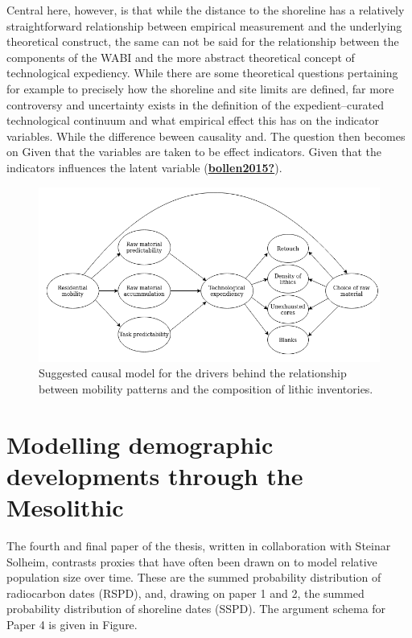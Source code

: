 \documentclass[
  12pt,
  a4paper,
  oneside]{book}
\begin{document}
Central here, however, is that while the distance to the shoreline has a relatively straightforward relationship between empirical measurement and the underlying theoretical construct, the same can not be said for the relationship between the components of the WABI and the more abstract theoretical concept of technological expediency. While there are some theoretical questions pertaining for example to precisely how the shoreline and site limits are defined, far more controversy and uncertainty exists in the definition of the expedient--curated technological continuum and what empirical effect this has on the indicator variables. While the difference beween causality and. The question then becomes on Given that the variables are taken to be effect indicators. Given that the indicators influences the latent variable (\protect\hyperlink{ref-bollen2015}{\textbf{bollen2015?}}).

\begin{figure}

{\centering \includegraphics[width=1\linewidth]{figures/dag_paper3} 

}

\caption{Suggested causal model for the drivers behind the relationship between mobility patterns and the composition of lithic inventories.}\label{fig:d3}
\end{figure}

\hypertarget{modelling-demographic-developments-through-the-mesolithic}{%
\section{Modelling demographic developments through the Mesolithic}\label{modelling-demographic-developments-through-the-mesolithic}}


The fourth and final paper of the thesis, written in collaboration with Steinar Solheim, contrasts proxies that have often been drawn on to model relative population size over time. These are the summed probability distribution of radiocarbon dates (RSPD), and, drawing on paper 1 and 2, the summed probability distribution of shoreline dates (SSPD). The argument schema for Paper 4 is given in Figure.
\end{document}
